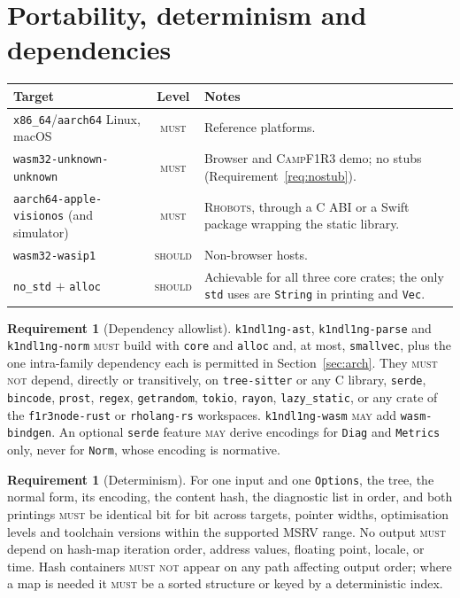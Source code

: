 \documentclass[11pt,a4paper]{article}
\newcommand{\code}[1]{\texttt{#1}}
\newcommand{\Camp}{\textsc{CampF1R3}}
\newcommand{\Rhobots}{\textsc{Rhobots}}
\newcommand{\MUST}{\textsc{must}}
\newcommand{\MUSTNOT}{\textsc{must not}}
\newcommand{\SHOULD}{\textsc{should}}
\newcommand{\MAY}{\textsc{may}}
\theoremstyle{definition}
\newtheorem{requirement}[definition]{Requirement}
\theoremstyle{plain}
\begin{document}
\section{Portability, determinism and dependencies}\label{sec:wasm}

\begin{center}
\begin{tabularx}{\linewidth}{@{}lc>{\raggedright\arraybackslash}X@{}}
\toprule
Target & Level & Notes\\
\midrule
\code{x86\_64}/\code{aarch64} Linux, macOS & \MUST & Reference platforms.\\
\code{wasm32-unknown-unknown} & \MUST & Browser and \Camp{} demo; no stubs
(Requirement~\ref{req:nostub}).\\
\code{aarch64-apple-visionos} (and simulator) & \MUST & \Rhobots, through a C
ABI or a Swift package wrapping the static library.\\
\code{wasm32-wasip1} & \SHOULD & Non-browser hosts.\\
\code{no\_std} $+$ \code{alloc} & \SHOULD & Achievable for all three core
crates; the only \code{std} uses are \code{String} in printing and \code{Vec}.\\
\bottomrule
\end{tabularx}
\end{center}

\begin{requirement}[Dependency allowlist]\label{req:deps}
\code{k1ndl1ng-ast}, \code{k1ndl1ng-parse} and \code{k1ndl1ng-norm} \MUST{}
build with \code{core} and \code{alloc} and, at most, \code{smallvec}, plus the
one intra-family dependency each is permitted in Section~\ref{sec:arch}. They
\MUSTNOT{} depend, directly or transitively, on \code{tree-sitter} or any C
library, \code{serde}, \code{bincode}, \code{prost}, \code{regex},
\code{getrandom}, \code{tokio}, \code{rayon}, \code{lazy\_static}, or any crate
of the \code{f1r3node-rust} or \code{rholang-rs} workspaces.
\code{k1ndl1ng-wasm} \MAY{} add \code{wasm-bindgen}. An optional \code{serde}
feature \MAY{} derive encodings for \code{Diag} and \code{Metrics} only, never
for \code{Norm}, whose encoding is normative.
\end{requirement}

\begin{requirement}[Determinism]\label{req:det}
For one input and one \code{Options}, the tree, the normal form, its encoding,
the content hash, the diagnostic list in order, and both printings \MUST{} be
identical bit for bit across targets, pointer widths, optimisation levels and
toolchain versions within the supported MSRV range. No output \MUST{} depend on
hash-map iteration order, address values, floating point, locale, or time. Hash
containers \MUSTNOT{} appear on any path affecting output order; where a map is
needed it \MUST{} be a sorted structure or keyed by a deterministic index.
\end{requirement}
\end{document}
